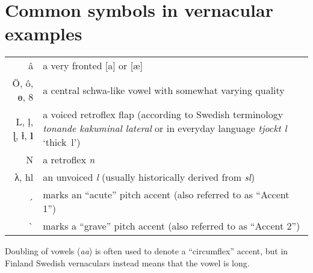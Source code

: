 ﻿\chapter{Common symbols in vernacular examples}
\label{bkm:Ref224104485}
\begin{tabular}{rl}
â & a very fronted [a] or [æ]\\[1em]
Ö, ô, ɵ, \textsc{8}  &  a central schwa-like vowel with somewhat varying quality\\[1em]
L, ḷ, ɭ, ƚ, \textbf{l} & 
\parbox{10cm}{a voiced retroflex flap (according to Swedish terminology \textit{tonande kakuminal lateral} or in everyday language \textit{tjockt l} ‘thick~l’)}\\[1em]
N & a retroflex \textit{n}\\[1em]
λ, hl  & an unvoiced \textit{l} (usually historically derived from \textit{sl})\\[1em]
´  & marks an “acute” pitch accent (also referred to as “Accent 1”)\\[1em]
\`{} & marks a “grave” pitch accent (also referred to as “Accent 2”)\\[1em]
\end{tabular}

Doubling of vowels (\textit{aa}) is often used to denote a “circumflex” accent, but in Finland Swedish vernaculars instead means that the vowel is long.
 
